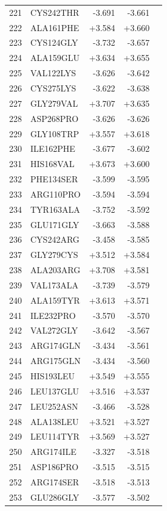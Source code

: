 \begin{longtable}{r l r r c}
221 & CYS242THR & -3.691 & -3.661 &  \\
222 & ALA161PHE & +3.584 & +3.660 &  \\
223 & CYS124GLY & -3.732 & -3.657 &  \\
224 & ALA159GLU & +3.634 & +3.655 &  \\
225 & VAL122LYS & -3.626 & -3.642 &  \\
226 & CYS275LYS & -3.622 & -3.638 &  \\
227 & GLY279VAL & +3.707 & +3.635 &  \\
228 & ASP268PRO & -3.626 & -3.626 &  \\
229 & GLY108TRP & +3.557 & +3.618 &  \\
230 & ILE162PHE & -3.677 & -3.602 &  \\
231 & HIS168VAL & +3.673 & +3.600 &  \\
232 & PHE134SER & -3.599 & -3.595 &  \\
233 & ARG110PRO & -3.594 & -3.594 &  \\
234 & TYR163ALA & -3.752 & -3.592 &  \\
235 & GLU171GLY & -3.663 & -3.588 &  \\
236 & CYS242ARG & -3.458 & -3.585 &  \\
237 & GLY279CYS & +3.512 & +3.584 &  \\
238 & ALA203ARG & +3.708 & +3.581 &  \\
239 & VAL173ALA & -3.739 & -3.579 &  \\
240 & ALA159TYR & +3.613 & +3.571 &  \\
241 & ILE232PRO & -3.570 & -3.570 &  \\
242 & VAL272GLY & -3.642 & -3.567 &  \\
243 & ARG174GLN & -3.434 & -3.561 &  \\
244 & ARG175GLN & -3.434 & -3.560 &  \\
245 & HIS193LEU & +3.549 & +3.555 &  \\
246 & LEU137GLU & +3.516 & +3.537 &  \\
247 & LEU252ASN & -3.466 & -3.528 &  \\
248 & ALA138LEU & +3.521 & +3.527 &  \\
249 & LEU114TYR & +3.569 & +3.527 &  \\
250 & ARG174ILE & -3.327 & -3.518 &  \\
251 & ASP186PRO & -3.515 & -3.515 &  \\
252 & ARG174SER & -3.518 & -3.513 &  \\
253 & GLU286GLY & -3.577 & -3.502 &  \\

\end{longtable}
